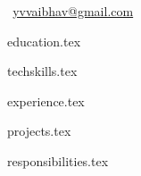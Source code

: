 \documentclass{resume} %
\newcommand*{\sectiondir}{_parts/}
\begin{document}
% 
%
{\centering
{}\selectfont
\faEnvelope$~~$\url{yvvaibhav@gmail.com} \hfill \faPhone$~~$ \hfill \faGithub$~~$ \hfill \faLinkedinSquare$~~$ \hfill \faGlobe$~~$\par
}
%
%
{education.tex}

%
%
{techskills.tex}

%
%
{experience.tex}

%
%
{projects.tex}

%
%

%
%
{responsibilities.tex}
\end{document}
